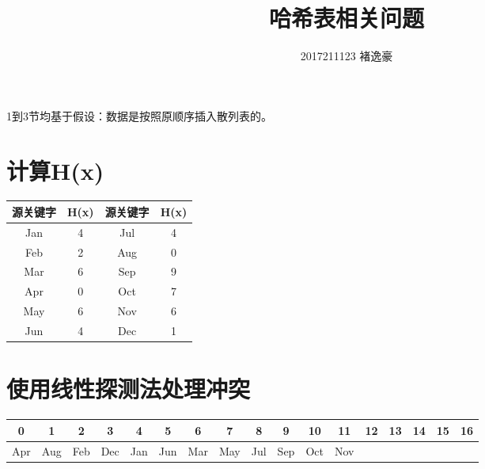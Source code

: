 \documentclass[UTF8]{ctexart}
\title{哈希表相关问题}
\author{2017211123 褚逸豪}
\begin{document}
    \maketitle
    1到3节均基于假设：数据是按照原顺序插入散列表的。
    \section{计算H(x)}
    \begin{center}
        \begin{tabular}{|c|c|c|c|}
            \hline
            源关键字 & H(x) & 源关键字 & H(x)\\
            \hline
            Jan & 4 & Jul & 4\\
            \hline
            Feb & 2 & Aug & 0\\
            \hline
            Mar & 6 & Sep & 9\\
            \hline
            Apr & 0 & Oct & 7\\
            \hline
            May & 6 & Nov & 6\\
            \hline
            Jun & 4 & Dec & 1\\
            \hline
        \end{tabular}
    \end{center}
    \section{使用线性探测法处理冲突}
    \begin{center}
        \begin{tabular}{|c|c|c|c|c|c|c|c|c|c|c|c|c|c|c|c|c|}
            \hline
            0&1&2&3&4&5&6&7&8&9&10&11&12&13&14&15&16\\
            \hline
            Apr&Aug&Feb&Dec&Jan&Jun&Mar&May&Jul&Sep&Oct&Nov& & & & &\\
            \hline
        \end{tabular}
    \end{center}
\end{document}
